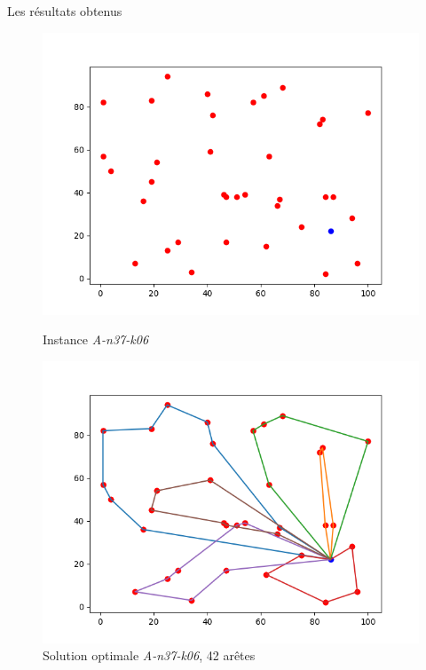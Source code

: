 \documentclass[a4paper,11pt]{article}%
\begin{document}
Les résultats obtenus

\begin{figure}
    \begin{minipage}[c]{.46\linewidth}

        \centering
        \includegraphics[scale=0.4]{instance3706}
        
        \caption{Instance \emph{A-n37-k06}}
        \label{A3706}

    \end{minipage}
    \hfill%
    \begin{minipage}[c]{.46\linewidth}
        \centering
        \includegraphics[scale=0.4]{best3706}
        
        \caption{Solution optimale \emph{A-n37-k06}, 42 arêtes}
        \label{SolA3706}
    \end{minipage}
    

\end{figure}
\end{document}
